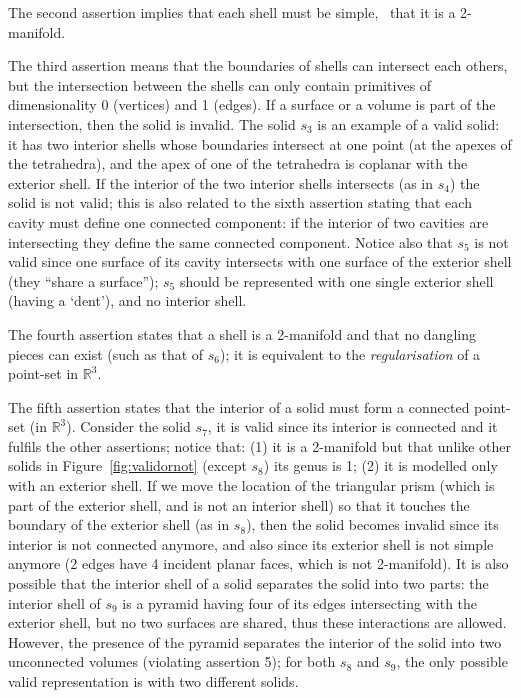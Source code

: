 The second assertion implies that each shell must be simple, \ie\ that it is a 2-manifold.

The third assertion means that the boundaries of shells can intersect each others, but the intersection between the shells can only contain primitives of dimensionality 0 (vertices) and 1 (edges).
If a surface or a volume is part of the intersection, then the solid is invalid.
The solid $s_3$ is an example of a valid solid: it has two interior shells whose boundaries intersect at one point (at the apexes of the tetrahedra), and the apex of one of the tetrahedra is coplanar with the exterior shell.
If the interior of the two interior shells intersects (as in $s_4$) the solid is not valid; this is also related to the sixth assertion stating that each cavity must define one connected component: if the interior of two cavities are intersecting they define the same connected component.
Notice also that $s_5$ is not valid since one surface of its cavity intersects with one surface of the exterior shell (they ``share a surface''); $s_5$ should be represented with one single exterior shell (having a `dent'), and no interior shell.

The fourth assertion states that a shell is a 2-manifold and that no dangling pieces can exist (such as that of $s_6$); it is equivalent to the \emph{regularisation} of a point-set in $\mathbb{R}^3$.

The fifth assertion states that the interior of a solid must form a connected point-set (in $\mathbb{R}^3$).
Consider the solid $s_7$, it is valid since its interior is connected and it fulfils the other assertions; notice that: (1) it is a 2-manifold but that unlike other solids in Figure~\ref{fig:validornot} (except $s_8$) its genus is 1; (2) it is modelled only with an exterior shell.
If we move the location of the triangular prism (which is part of the exterior shell, and is not an interior shell) so that it touches the boundary of the exterior shell (as in $s_8$), then the solid becomes invalid since its interior is not connected anymore, and also since its exterior shell is not simple anymore (2 edges have 4 incident planar faces, which is not 2-manifold).
It is also possible that the interior shell of a solid separates the solid into two parts: the interior shell of $s_9$ is a pyramid having four of its edges intersecting with the exterior shell, but no two surfaces are shared, thus these interactions are allowed.
However, the presence of the pyramid separates the interior of the solid into two unconnected volumes (violating assertion 5); for both $s_8$ and $s_9$, the only possible valid representation is with two different solids.

